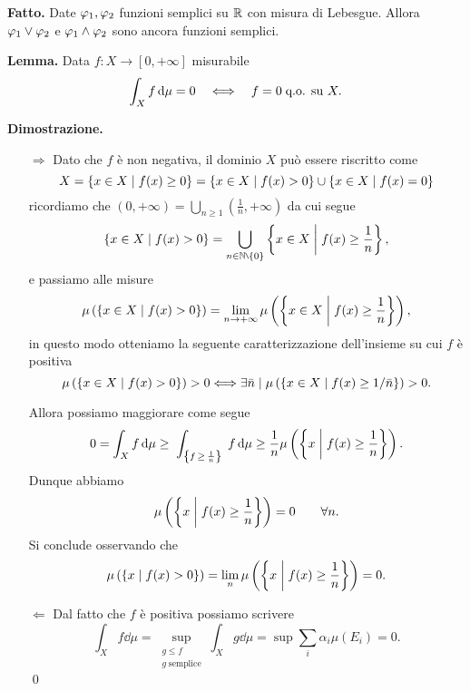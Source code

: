 \documentclass[a4paper, 12pt]{report}
\begin{document}
\textbf{Fatto.}
Date $\varphi_1, \varphi_2$ funzioni semplici su $\mathbb R$ con misura di Lebesgue.
Allora $\varphi_1 \vee \varphi_2$ e $\varphi_1 \wedge \varphi_2$ sono ancora funzioni semplici.

\textbf{Lemma.}
Data $f \colon X \to [0, +\infty]$ misurabile
$$
\int_X f \,\mathrm{d} \mu = 0 \quad \Longleftrightarrow \quad f = 0 \; \text{q.o. su } X.
$$

\textbf{Dimostrazione.}
\begin{itemize}

\item[$\boxed{\Rightarrow}$] Dato che $f$ è non negativa, il dominio $X$ può essere riscritto come
$$
	X = \left\{ x \in X \;\middle|\; f(x) \geq 0 \right\} = \left\{ x \in X \;\middle|\; f(x) > 0 \right\} \cup \left\{ x \in X \;\middle|\; f(x) = 0 \right\}
$$
ricordiamo che $(0, +\infty) = \bigcup_{n \geq 1} (\frac{1}{n}, +\infty)$ da cui segue
$$
	\left\{ x \in X \mymid f(x) > 0 \right\} =  \bigcup_{n \in \N \setminus \left\{ 0 \right\}} \left\{ x \in X \mymid f(x) \geq \frac{1}{n} \right\},
$$
e passiamo alle misure
$$
	\mu \left( \left\{ x \in X \;\middle|\; f(x) > 0 \right\} \right) 
	= \lim_{n \to +\infty} \mu\left(\left\{ x \in X \;\middle|\; f(x) \geq \frac{1}{n} \right\}\right),
$$
in questo modo otteniamo la seguente caratterizzazione dell'insieme su cui $f$ è positiva
$$
	\mu \left( \left\{ x \in X \;\middle|\; f(x) > 0 \right\} \right) >0 
	\Longleftrightarrow
	\exists \bar{n} \mid \mu \left( \left\{ x \in X \;\middle|\; f(x) \geq 1 / \bar{n} \right\} \right) > 0.
$$

Allora possiamo maggiorare come segue
$$
	0 = \int_X f \,\mathrm{d} \mu 
	\geq \;\int_{\left\{ f \,\geq\, \frac{1}{n} \right\}} \; f \,\mathrm{d} \mu \geq	\frac{1}{n} \mu \left(  \left\{ x \;\middle|\; f(x) \geq \frac{1}{n} \right\} \right). 
$$
Dunque abbiamo
$$
	\mu \left(  \left\{ x \;\middle|\; f(x) \geq \frac{1}{n} \right\} \right) = 0 \qquad \forall n.
$$
Si conclude osservando che
$$
	\mu \left(  \left\{ x \;\middle|\; f(x) > 0 \right\} \right) = \lim_n \mu \left( \left\{ x \;\middle|\; f(x) \geq \frac{1}{n} \right\} \right) = 0.
$$

\item[$\boxed{\Leftarrow}$]
Dal fatto che $f$ è positiva possiamo scrivere
$$
	\int_X f \dd \mu = \sup_{\substack{g \leq f \\ g \; \text{semplice}}} \int_X g \dd \mu = \sup \sum_{i}^{} \alpha_i \mu(E_i) = 0. 
$$
\qed

\end{itemize}
\end{document}
